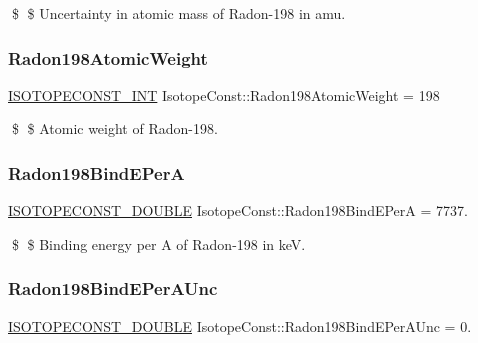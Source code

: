 \$ \$ Uncertainty in atomic mass of Radon-\/198 in amu. \mbox{\label{group___isotope_const-_radon-_rn198_gaac8b617abc890fb8fec2d14ba4e56774}} 
\subsubsection{\texorpdfstring{Radon198\+Atomic\+Weight}{Radon198AtomicWeight}}
{\footnotesize\ttfamily \mbox{\hyperlink{group___isotope_const-_macros_ga5f18360b3e99483a35c32d789e62621c}{I\+S\+O\+T\+O\+P\+E\+C\+O\+N\+S\+T\+\_\+\+I\+NT}} Isotope\+Const\+::\+Radon198\+Atomic\+Weight = 198}

\$ \$ Atomic weight of Radon-\/198. \mbox{\label{group___isotope_const-_radon-_rn198_ga89139d5afd7afb5dd35aa536dd69cbc9}} 
\subsubsection{\texorpdfstring{Radon198\+Bind\+E\+PerA}{Radon198BindEPerA}}
{\footnotesize\ttfamily \mbox{\hyperlink{group___isotope_const-_macros_ga8f45a7272ce02c0b4c65c44636ed719a}{I\+S\+O\+T\+O\+P\+E\+C\+O\+N\+S\+T\+\_\+\+D\+O\+U\+B\+LE}} Isotope\+Const\+::\+Radon198\+Bind\+E\+PerA = 7737.}

\$ \$ Binding energy per A of Radon-\/198 in keV. \mbox{\label{group___isotope_const-_radon-_rn198_ga04543a438d90e8d27cd6a47e9153c8d5}} 
\subsubsection{\texorpdfstring{Radon198\+Bind\+E\+Per\+A\+Unc}{Radon198BindEPerAUnc}}
{\footnotesize\ttfamily \mbox{\hyperlink{group___isotope_const-_macros_ga8f45a7272ce02c0b4c65c44636ed719a}{I\+S\+O\+T\+O\+P\+E\+C\+O\+N\+S\+T\+\_\+\+D\+O\+U\+B\+LE}} Isotope\+Const\+::\+Radon198\+Bind\+E\+Per\+A\+Unc = 0.}

